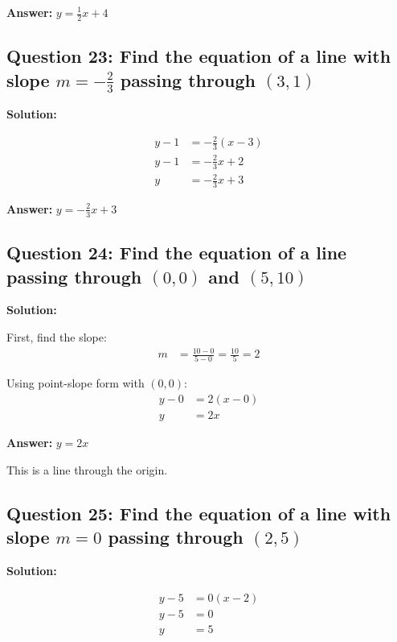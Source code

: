 \documentclass[12pt]{article}
\begin{document}
\textbf{Answer: } $y = \frac{1}{2}x + 4$

\vspace{0.3cm}

\subsection*{Question 23: Find the equation of a line with slope $m = -\frac{2}{3}$ passing through $(3, 1)$}

\noindent\textbf{Solution:}

\begin{align*}
y - 1 &= -\frac{2}{3}(x - 3) \\
y - 1 &= -\frac{2}{3}x + 2 \\
y &= -\frac{2}{3}x + 3
\end{align*}

\textbf{Answer: } $y = -\frac{2}{3}x + 3$

\vspace{0.3cm}

\subsection*{Question 24: Find the equation of a line passing through $(0, 0)$ and $(5, 10)$}

\noindent\textbf{Solution:}

First, find the slope:
\begin{align*}
m &= \frac{10 - 0}{5 - 0} = \frac{10}{5} = 2
\end{align*}

Using point-slope form with $(0, 0)$:
\begin{align*}
y - 0 &= 2(x - 0) \\
y &= 2x
\end{align*}

\textbf{Answer: } $y = 2x$

This is a line through the origin.

\vspace{0.3cm}

\subsection*{Question 25: Find the equation of a line with slope $m = 0$ passing through $(2, 5)$}

\noindent\textbf{Solution:}

\begin{align*}
y - 5 &= 0(x - 2) \\
y - 5 &= 0 \\
y &= 5
\end{align*}
\end{document}
